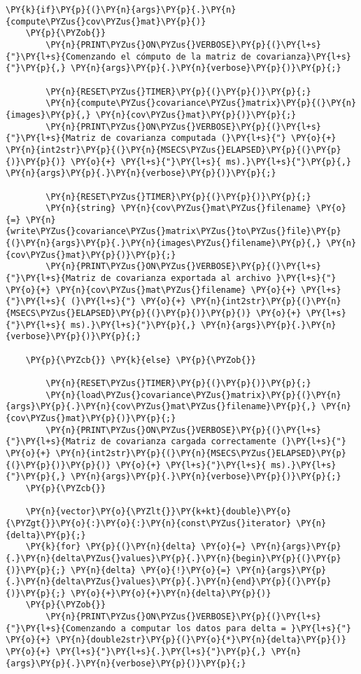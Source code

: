 \begin{Verbatim}[commandchars=\\\{\}]
	\PY{k}{if}\PY{p}{(}\PY{n}{args}\PY{p}{.}\PY{n}{compute\PYZus{}cov\PYZus{}mat}\PY{p}{)}
	\PY{p}{\PYZob{}}
		\PY{n}{PRINT\PYZus{}ON\PYZus{}VERBOSE}\PY{p}{(}\PY{l+s}{"}\PY{l+s}{Comenzando el cómputo de la matriz de covarianza}\PY{l+s}{"}\PY{p}{,} \PY{n}{args}\PY{p}{.}\PY{n}{verbose}\PY{p}{)}\PY{p}{;}
		
		\PY{n}{RESET\PYZus{}TIMER}\PY{p}{(}\PY{p}{)}\PY{p}{;}
		\PY{n}{compute\PYZus{}covariance\PYZus{}matrix}\PY{p}{(}\PY{n}{images}\PY{p}{,} \PY{n}{cov\PYZus{}mat}\PY{p}{)}\PY{p}{;}
		\PY{n}{PRINT\PYZus{}ON\PYZus{}VERBOSE}\PY{p}{(}\PY{l+s}{"}\PY{l+s}{Matriz de covarianza computada (}\PY{l+s}{"} \PY{o}{+} \PY{n}{int2str}\PY{p}{(}\PY{n}{MSECS\PYZus{}ELAPSED}\PY{p}{(}\PY{p}{)}\PY{p}{)} \PY{o}{+} \PY{l+s}{"}\PY{l+s}{ ms).}\PY{l+s}{"}\PY{p}{,} \PY{n}{args}\PY{p}{.}\PY{n}{verbose}\PY{p}{)}\PY{p}{;}

		\PY{n}{RESET\PYZus{}TIMER}\PY{p}{(}\PY{p}{)}\PY{p}{;}
		\PY{n}{string} \PY{n}{cov\PYZus{}mat\PYZus{}filename} \PY{o}{=} \PY{n}{write\PYZus{}covariance\PYZus{}matrix\PYZus{}to\PYZus{}file}\PY{p}{(}\PY{n}{args}\PY{p}{.}\PY{n}{images\PYZus{}filename}\PY{p}{,} \PY{n}{cov\PYZus{}mat}\PY{p}{)}\PY{p}{;}
		\PY{n}{PRINT\PYZus{}ON\PYZus{}VERBOSE}\PY{p}{(}\PY{l+s}{"}\PY{l+s}{Matriz de covarianza exportada al archivo }\PY{l+s}{"} \PY{o}{+} \PY{n}{cov\PYZus{}mat\PYZus{}filename} \PY{o}{+} \PY{l+s}{"}\PY{l+s}{ (}\PY{l+s}{"} \PY{o}{+} \PY{n}{int2str}\PY{p}{(}\PY{n}{MSECS\PYZus{}ELAPSED}\PY{p}{(}\PY{p}{)}\PY{p}{)} \PY{o}{+} \PY{l+s}{"}\PY{l+s}{ ms).}\PY{l+s}{"}\PY{p}{,} \PY{n}{args}\PY{p}{.}\PY{n}{verbose}\PY{p}{)}\PY{p}{;}

	\PY{p}{\PYZcb{}} \PY{k}{else} \PY{p}{\PYZob{}}

		\PY{n}{RESET\PYZus{}TIMER}\PY{p}{(}\PY{p}{)}\PY{p}{;}
		\PY{n}{load\PYZus{}covariance\PYZus{}matrix}\PY{p}{(}\PY{n}{args}\PY{p}{.}\PY{n}{cov\PYZus{}mat\PYZus{}filename}\PY{p}{,} \PY{n}{cov\PYZus{}mat}\PY{p}{)}\PY{p}{;}
		\PY{n}{PRINT\PYZus{}ON\PYZus{}VERBOSE}\PY{p}{(}\PY{l+s}{"}\PY{l+s}{Matriz de covarianza cargada correctamente (}\PY{l+s}{"} \PY{o}{+} \PY{n}{int2str}\PY{p}{(}\PY{n}{MSECS\PYZus{}ELAPSED}\PY{p}{(}\PY{p}{)}\PY{p}{)} \PY{o}{+} \PY{l+s}{"}\PY{l+s}{ ms).}\PY{l+s}{"}\PY{p}{,} \PY{n}{args}\PY{p}{.}\PY{n}{verbose}\PY{p}{)}\PY{p}{;}
	\PY{p}{\PYZcb{}}

	\PY{n}{vector}\PY{o}{\PYZlt{}}\PY{k+kt}{double}\PY{o}{\PYZgt{}}\PY{o}{:}\PY{o}{:}\PY{n}{const\PYZus{}iterator} \PY{n}{delta}\PY{p}{;}
	\PY{k}{for} \PY{p}{(}\PY{n}{delta} \PY{o}{=} \PY{n}{args}\PY{p}{.}\PY{n}{delta\PYZus{}values}\PY{p}{.}\PY{n}{begin}\PY{p}{(}\PY{p}{)}\PY{p}{;} \PY{n}{delta} \PY{o}{!}\PY{o}{=} \PY{n}{args}\PY{p}{.}\PY{n}{delta\PYZus{}values}\PY{p}{.}\PY{n}{end}\PY{p}{(}\PY{p}{)}\PY{p}{;} \PY{o}{+}\PY{o}{+}\PY{n}{delta}\PY{p}{)}
	\PY{p}{\PYZob{}}
		\PY{n}{PRINT\PYZus{}ON\PYZus{}VERBOSE}\PY{p}{(}\PY{l+s}{"}\PY{l+s}{Comenzando a computar los datos para delta = }\PY{l+s}{"} \PY{o}{+} \PY{n}{double2str}\PY{p}{(}\PY{o}{*}\PY{n}{delta}\PY{p}{)} \PY{o}{+} \PY{l+s}{"}\PY{l+s}{.}\PY{l+s}{"}\PY{p}{,} \PY{n}{args}\PY{p}{.}\PY{n}{verbose}\PY{p}{)}\PY{p}{;}


\end{Verbatim}
